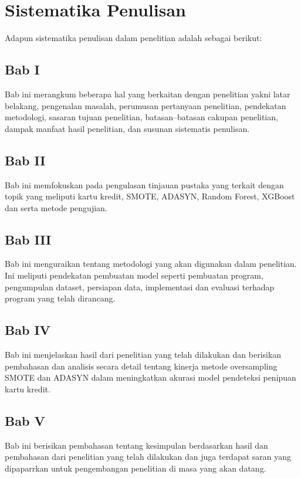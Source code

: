 \section{Sistematika Penulisan} \label{I.Sistematika}
Adapun sistematika penulisan dalam penelitian adalah sebagai berikut:
\subsection{Bab I}
Bab ini merangkum beberapa hal yang berkaitan dengan penelitian yakni latar belakang, pengenalan masalah, perumusan pertanyaan penelitian, pendekatan metodologi, sasaran tujuan penelitian, batasan–batasan cakupan penelitian, dampak manfaat hasil penelitian, dan susunan sistematis penulisan.
\subsection{Bab II}
Bab ini memfokuskan pada pengulasan tinjauan pustaka yang terkait dengan topik yang meliputi kartu kredit, SMOTE, ADASYN, Random Forest, XGBoost dan serta metode pengujian.
\subsection{Bab III}
Bab ini menguraikan tentang metodologi yang akan digunakan dalam penelitian. Ini meliputi pendekatan pembuatan model seperti pembuatan program, pengumpulan dataset, persiapan data, implementasi dan evaluasi terhadap program yang telah dirancang.
\subsection{Bab IV}
Bab ini menjelaskan hasil dari penelitian yang telah dilakukan dan berisikan pembahasan dan analisis secara detail tentang kinerja metode oversampling SMOTE dan ADASYN dalam meningkatkan akurasi model pendeteksi penipuan kartu kredit.
\subsection{Bab V}
Bab ini berisikan pembahasan tentang kesimpulan berdasarkan hasil dan pembahasan dari penelitian yang telah dilakukan dan juga terdapat saran yang dipaparrkan untuk pengembangan penelitian di masa yang akan datang. 
